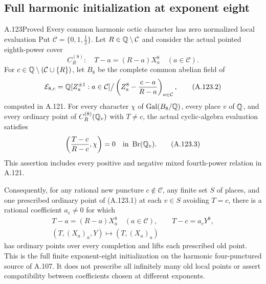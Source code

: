 \subsection{Full harmonic initialization at exponent eight}

\begin{statement}{A.123}{Proved}
{Every common harmonic octic character has zero normalized local evaluation}
Put $\mathcal C=\{0,1,\tfrac12\}$.
Let $R\in\mathbb Q\setminus\mathcal C$ and consider the actual
pointed eighth-power cover
\[
 C_R^{(8)}:\quad
       T-a=(R-a)X_a^8\quad(a\in\mathcal C).
\tag{A.123.1}
\]
For $c\in\mathbb Q\setminus(\mathcal C\cup\{R\})$, let $B_8$
be the complete common abelian field of
\[
 \mathcal E_{8,c}=
  \mathbb Q[Z_a^{\pm1}:a\in\mathcal C]
       \big/\left(Z_a^8-\frac{c-a}{R-a}\right)_{a\in\mathcal C},
\tag{A.123.2}
\]
computed in A.121.
For every character $\chi$ of
$\operatorname{Gal}(B_8/\mathbb Q)$, every place $v$ of $\mathbb Q$,
and every ordinary point of $C_R^{(8)}(\mathbb Q_v)$ with
$T\ne c$, the actual cyclic-algebra evaluation satisfies
\[
                    \left(\frac{T-c}{R-c},\chi\right)=0
                                      \quad\text{in }\operatorname{Br}(\mathbb Q_v).
\tag{A.123.3}
\]
This assertion includes every positive and negative
mixed fourth-power relation in A.121.

Consequently, for any rational new puncture
$c\notin\mathcal C$, any finite set $S$ of places, and
one prescribed ordinary point of (A.123.1) at each
$v\in S$ avoiding $T=c$, there is a rational coefficient
$a_c\ne0$ for which
\[
 \begin{gathered}
 T-a=(R-a)X_a^8\quad(a\in\mathcal C),\qquad
 T-c=a_cY^8,\\
 (T,(X_a)_a,Y)\longmapsto(T,(X_a)_a)
 \end{gathered}
\tag{A.123.4}
\]
has ordinary points over every completion and lifts
each prescribed old point.
This is the full finite exponent-eight initialization
on the harmonic four-punctured source of A.107.
It does not prescribe all infinitely many old local
points or assert compatibility between coefficients
chosen at different exponents.
\end{statement}
